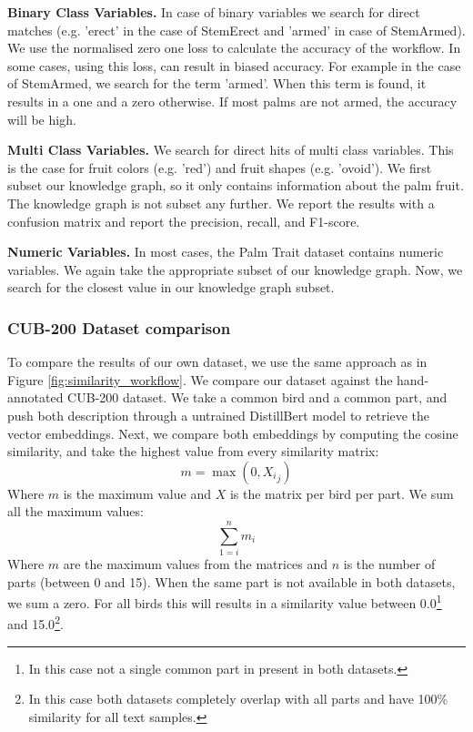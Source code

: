 \documentclass[a4paper, 12pt, oneside]{book} %
\begin{document}
\noindent
\textbf{Binary Class Variables.}
In case of binary variables we search for direct matches (e.g. 'erect' in the case of StemErect and 'armed' in case of StemArmed).
We use the normalised zero one loss \autocite{sammut_zero-one_2010} to calculate the accuracy of the workflow.
In some cases, using this loss, can result in biased accuracy.
For example in the case of StemArmed, we search for the term 'armed'. When this term is found, it results in a one and a zero otherwise. 
If most palms are not armed, the accuracy will be high.
\newline

\noindent
\textbf{Multi Class Variables.}
We search for direct hits of multi class variables.
This is the case for fruit colors (e.g. 'red') and fruit shapes (e.g. 'ovoid').
We first subset our knowledge graph, so it only contains information about the palm fruit. 
The knowledge graph is not subset any further.
We report the results with a confusion matrix and report the precision, recall, and F1-score.
\newline

\noindent
\textbf{Numeric Variables.}
In most cases, the Palm Trait dataset contains numeric variables.
We again take the appropriate subset of our knowledge graph.
Now, we search for the closest value in our knowledge graph subset.

\subsubsection{CUB-200 Dataset comparison}
To compare the results of our own dataset, we use the same approach as in Figure \ref{fig:similarity_workflow}.
We compare our dataset against the hand-annotated CUB-200 dataset.
We take a common bird and a common part, and push both description through a untrained DistillBert model to retrieve the vector embeddings.
Next, we compare both embeddings by computing the cosine similarity, and take the highest value from every similarity matrix:
\begin{equation}
    m=\max(0,  {X_i}_j  )
\end{equation}
Where $m$ is the maximum value and $X$ is the matrix per bird per part.
We sum all the maximum values:
\begin{equation}
     \sum_{1=i}^{n} m_i
\end{equation}
Where $m$ are the maximum values from the matrices and $n$ is the number of parts (between 0 and 15).
When the same part is not available in both datasets, we sum a zero.
For all birds this will results in a similarity value between 0.0\footnote{In this case not a single common part in present in both datasets.} and 15.0\footnote{In this case both datasets completely overlap with all parts and have 100\% similarity for all text samples.}.
\end{document}
